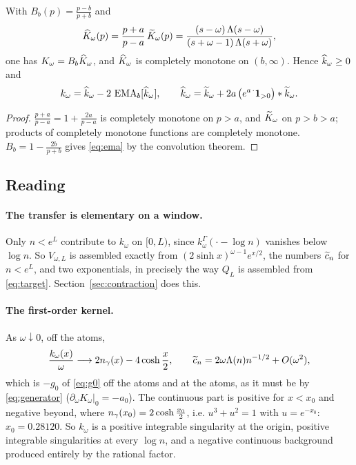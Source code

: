 \begin{proposition}\label{prop:blaschke}
With $B_b(p)=\frac{p-b}{p+b}$ and
\begin{equation}\label{eq:khat}
 \widehat K_\omega(p)=\frac{p+a}{p-a}\,\widetilde K_\omega(p)
 =\frac{(s-\omega)\,\Lambda(s-\omega)}{(s+\omega-1)\,\Lambda(s+\omega)},
\end{equation}
one has $K_\omega=B_b\widehat K_\omega$, and $\widehat K_\omega$ is completely monotone on
$(b,\infty)$. Hence $\widehat k_\omega\geq0$ and
\begin{equation}\label{eq:ema}
 k_\omega=\widehat k_\omega-2\,\operatorname{EMA}_b[\widehat k_\omega],\qquad
 \widehat k_\omega=\widetilde k_\omega+2a\,\big(e^{a\,\cdot}\mathbf 1_{>0}\big)*\widetilde k_\omega .
\end{equation}
\end{proposition}
\begin{proof}
$\frac{p+a}{p-a}=1+\frac{2a}{p-a}$ is completely monotone on $p>a$, and
$\widetilde K_\omega$ on $p>b>a$; products of completely monotone functions are
completely monotone. $B_b=1-\frac{2b}{p+b}$ gives \eqref{eq:ema} by the
convolution theorem.
\end{proof}

\subsection{Reading}

\paragraph{The transfer is elementary on a window.} Only $n<e^L$ contribute to
$k_\omega$ on $[0,L)$, since $k^\Gamma_\omega(\cdot-\log n)$ vanishes below
$\log n$. So $V_{\omega,L}$ is assembled exactly from $(2\sinh x)^{\omega-1}e^{x/2}$,
the numbers $\widetilde c_n$ for $n<e^L$, and two exponentials, in precisely the way
$Q_L$ is assembled from \eqref{eq:target}. Section~\ref{sec:contraction} does
this.

\paragraph{The first-order kernel.} As $\omega\downarrow0$, off the atoms,
\begin{equation}\label{eq:firstorder}
 \frac{k_\omega(x)}\omega\longrightarrow2n_{\gamma}(x)-4\cosh\frac x2,\qquad
 \widetilde c_n=2\omega\Lambda(n)n^{-1/2}+O(\omega^2),
\end{equation}
which is $-g_0$ of \eqref{eq:g0} off the atoms and at the atoms, as it must be
by \eqref{eq:generator} ($\partial_\omega K_\omega|_0=-a_0$). The continuous
part is positive for $x<x_0$ and negative beyond, where
$n_{\gamma}(x_0)=2\cosh\frac{x_0}2$, i.e. $u^3+u^2=1$ with $u=e^{-x_0}$:
$x_0=0.28120$. So $k_\omega$ is a positive integrable singularity at the
origin, positive integrable singularities at every $\log n$, and a negative
continuous background produced entirely by the rational factor.

